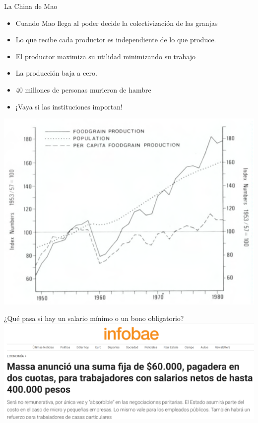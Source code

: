 \documentclass{beamer}
\begin{document}
\begin{frame}{La China de Mao }
\small
\begin{itemize}
    \item Cuando Mao llega al poder decide la colectivización de las granjas
    \item Lo que recibe cada productor es independiente de lo que produce. 
    \item El productor maximiza su utilidad minimizando su trabajo 
     \item La producción baja a cero.  
     \item 40 millones de personas murieron de hambre
     \item ¡Vaya si las instituciones importan! 
\end{itemize}
\begin{center}
    \includegraphics[scale=0.5]{../Figures/C19.18.png}
\end{center}

\end{frame}

\begin{frame}{¿Qué pasa si hay un salario mínimo o un bono obligatorio?}
\centering
\includegraphics[scale=0.33]{../Figures/M9.5.png}
\end{frame}
\end{document}
